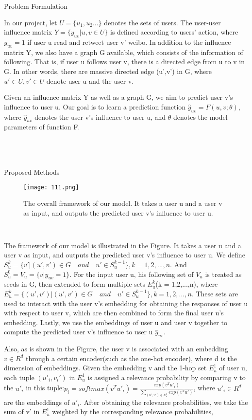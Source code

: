 \documentclass{article}
\begin{document}
\par Problem Formulation\\
\par In our project, let $U=\{u_1,u_2 ...\}$ denotes the sets of users. The user-user influence matrix $Y=\{y_{uv}|u,v\in U\}$ is defined according to users' action, where $y_{uv}=1$ if user u read and retweet user v' weibo. In addition to the influence matrix Y, we also have a graph G available, which consists of the information of following. That is, if user u follows user v, there is a directed edge from u to v in G. In other words, there are massive directed edge (u',v') in G, where $u'\in U, v'\in U$ denote user u and the user v.
\par Given an influence matrix Y as well as a graph G, we aim to predict user v's influence to user u. Our goal is to learn a prediction function $\hat{y}_{uv}=F(u,v;\theta)$, where $\hat{y}_{uv}$ denotes the user v's influence to user u, and $\theta$ denotes the model parameters of function F.\\
\\
\\
\\
\par Proposed Methods\\
\begin{figure}[ht]
\centering
\texttt{[image: 111.png]}
\caption{The overall framework of our model. It takes a user u and a user v as input, and outputs the predicted user v's influence to user u.}
\end{figure}\\
\par The framework of our model is illustrated in the Figure. It takes a user u and a user v as input, and outputs the predicted user v's influence to user u. We define $S^k_{u}=\{v'|(u',v') \in G \quad and \quad u' \in S^{k-1}_{u} \}, k = 1, 2, ...,n.$ And $S^0_u=V_u=\{v|y_{uv}=1\}$. For the input user u, his following set of $V_u$ is treated as seeds in G, then extended to form multiple sets $E^k_u$(k = 1,2,...,n), where $E^k_{u}=\{(u',v')|(u',v') \in G \quad and \quad u' \in S^{k-1}_{u} \}, k = 1, 2, ...,n.$ These sets are used to interact with the user v's embedding for obtaining the responses of user u with respect to user v, which are then combined to form the final user u's embedding. Lastly, we use the embeddings of user u and user v together to compute the predicted user v's influence to user u $\hat{y}_{uv}.$
\par Also, as is shown in the Figure, the user v is associated with an embedding $v\in R^d$ through a certain encoder(such as the one-hot encoder), where d is the dimension of embeddings. Given the embedding v and the 1-hop set $E^1_u$ of user u, each tuple $(u'_i,v_i')$ in $E^1_u$ is assigned a relevance probability by comparing v to the $u'_i$ in this tuple:$p_i=softmax(v^T u'_i)=\frac{exp(v^T u'_i)}{\sum_{(u',v')\in E^1_u} exp(v^T u')}$, where $u'_i \in R^d$  are the embeddings of $u'_i$. After obtaining the relevance probabilities, we take the sum of v' in $E^1_u$ weighted by the corresponding relevance probabilities,
\end{document}

